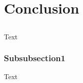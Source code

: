 \section{Conclusion}\label{sec:conclusion}



\subsection{}
Text
\subsubsection{Subsubsection1}
Text
